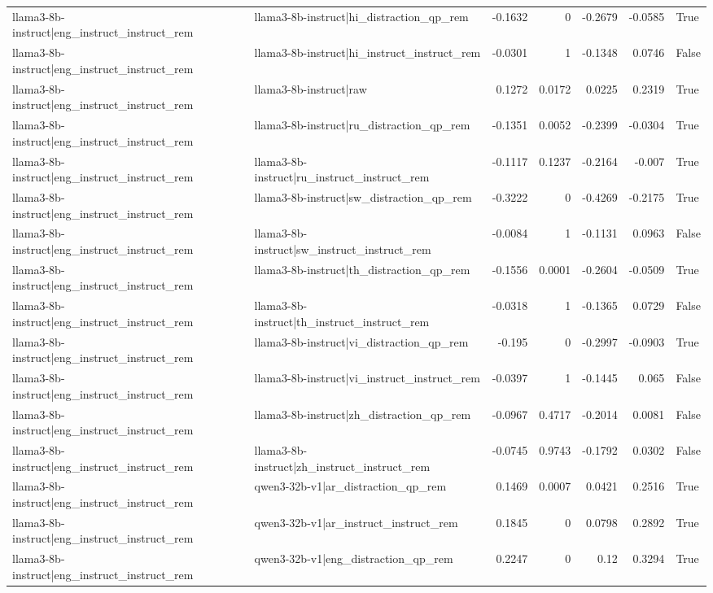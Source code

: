 \begin{table}
\begin{tabular}{l l r r r r l}
llama3-8b-instruct|eng_instruct_instruct_rem & llama3-8b-instruct|hi_distraction_qp_rem & -0.1632 & 0 & -0.2679 & -0.0585 & True \\
llama3-8b-instruct|eng_instruct_instruct_rem & llama3-8b-instruct|hi_instruct_instruct_rem & -0.0301 & 1 & -0.1348 & 0.0746 & False \\
llama3-8b-instruct|eng_instruct_instruct_rem & llama3-8b-instruct|raw & 0.1272 & 0.0172 & 0.0225 & 0.2319 & True \\
llama3-8b-instruct|eng_instruct_instruct_rem & llama3-8b-instruct|ru_distraction_qp_rem & -0.1351 & 0.0052 & -0.2399 & -0.0304 & True \\
llama3-8b-instruct|eng_instruct_instruct_rem & llama3-8b-instruct|ru_instruct_instruct_rem & -0.1117 & 0.1237 & -0.2164 & -0.007 & True \\
llama3-8b-instruct|eng_instruct_instruct_rem & llama3-8b-instruct|sw_distraction_qp_rem & -0.3222 & 0 & -0.4269 & -0.2175 & True \\
llama3-8b-instruct|eng_instruct_instruct_rem & llama3-8b-instruct|sw_instruct_instruct_rem & -0.0084 & 1 & -0.1131 & 0.0963 & False \\
llama3-8b-instruct|eng_instruct_instruct_rem & llama3-8b-instruct|th_distraction_qp_rem & -0.1556 & 0.0001 & -0.2604 & -0.0509 & True \\
llama3-8b-instruct|eng_instruct_instruct_rem & llama3-8b-instruct|th_instruct_instruct_rem & -0.0318 & 1 & -0.1365 & 0.0729 & False \\
llama3-8b-instruct|eng_instruct_instruct_rem & llama3-8b-instruct|vi_distraction_qp_rem & -0.195 & 0 & -0.2997 & -0.0903 & True \\
llama3-8b-instruct|eng_instruct_instruct_rem & llama3-8b-instruct|vi_instruct_instruct_rem & -0.0397 & 1 & -0.1445 & 0.065 & False \\
llama3-8b-instruct|eng_instruct_instruct_rem & llama3-8b-instruct|zh_distraction_qp_rem & -0.0967 & 0.4717 & -0.2014 & 0.0081 & False \\
llama3-8b-instruct|eng_instruct_instruct_rem & llama3-8b-instruct|zh_instruct_instruct_rem & -0.0745 & 0.9743 & -0.1792 & 0.0302 & False \\
llama3-8b-instruct|eng_instruct_instruct_rem & qwen3-32b-v1|ar_distraction_qp_rem & 0.1469 & 0.0007 & 0.0421 & 0.2516 & True \\
llama3-8b-instruct|eng_instruct_instruct_rem & qwen3-32b-v1|ar_instruct_instruct_rem & 0.1845 & 0 & 0.0798 & 0.2892 & True \\
llama3-8b-instruct|eng_instruct_instruct_rem & qwen3-32b-v1|eng_distraction_qp_rem & 0.2247 & 0 & 0.12 & 0.3294 & True \\

\end{tabular}
\end{table}
